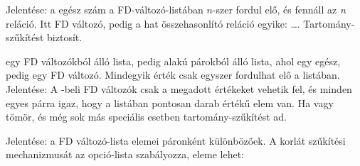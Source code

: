 \medskip

{}

Jelentése: a  egész szám a  FD-változó-listában $n$-szer fordul elő,
és fennáll az  {\it n}  reláció. Itt  FD változó,
 pedig a hat összehasonlító reláció egyike: \cd{\#=, \#\bs=, \#<} \ldots.
Tartomány-szűkítést biztosít.

\medskip

{}

 egy FD változókból álló lista,  pedig   alakú párokból
álló lista, ahol  egy egész,  pedig egy FD változó. Mindegyik 
érték csak egyszer fordulhat elő a  listában. Jelentése: A -beli
FD változók csak a megadott  értékeket vehetik fel, és minden egyes 
párra igaz, hogy a  listában pontosan  darab  értékű elem van.
Ha  vagy  tömör, és még sok más speciális esetben tartomány-szűkítést
ad.

\medskip

\label{all_distinct}
{}

Jelentése: a  FD változó-lista elemei páronként különbözőek.
A korlát szűkítési mechanizmusát az  opció-lista szabályozza,
eleme lehet:

